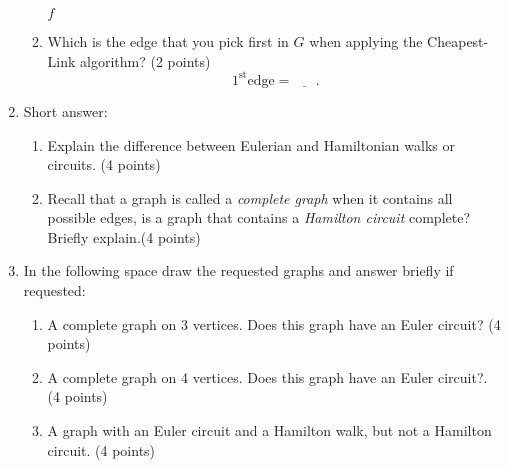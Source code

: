 \documentclass[12pt]{exam}
\begin{document}
\begin{enumerate}
\begin{enumerate}
\begin{checkboxes}
    \choice $f$
\end{checkboxes}
\vfill
\item \label{lastQnSec2} Which is the edge that you pick first in $G$ when applying the Cheapest-Link algorithm? (2 points)
$$1^{\text{st}}\text{edge}=\underline{\phantom{ans}}.$$
\vfill
\end{enumerate}
\newpage
\item Short answer:
\begin{enumerate}
    \item Explain the difference between Eulerian and Hamiltonian walks or circuits. (4 points)
    \vspace{3cm}
    \item Recall that a graph is called a \emph{complete graph} when it contains all possible edges, is a graph that contains a \emph{Hamilton circuit} complete? Briefly explain.(4 points)
    \vspace{3cm}
\end{enumerate}


\item In the following space draw the requested graphs and answer briefly if requested:
\begin{enumerate}
    \item A complete graph on 3 vertices. Does this graph have an Euler circuit? (4 points)
    \vspace{3.5cm}
    \item A complete graph on 4 vertices. Does this graph have an Euler circuit?. (4 points)
    \vspace{3.5cm}
    \item A graph with an Euler circuit and a Hamilton walk, but not a Hamilton circuit. (4 points)
    \vfill
\end{enumerate}


\end{enumerate}
\end{document}
